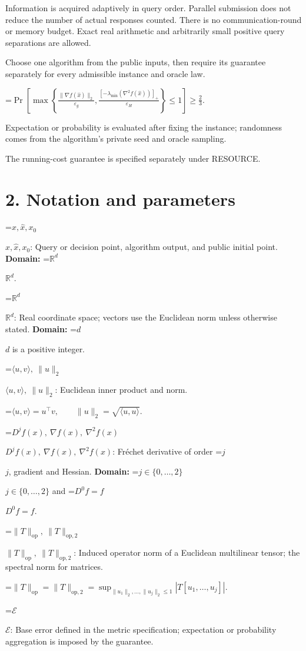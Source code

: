 \documentclass[10pt,a4paper]{article}
\newcommand{\AtlasMath}[1]{\par\begingroup\centering\setbox0=\hbox{$\displaystyle #1$}\ifdim\wd0>1.4\linewidth\typeout{ATLAS WIDE FORMULA: \the\wd0}\fi\ifdim\wd0>\linewidth\resizebox{\linewidth}{!}{\box0}\else\box0\fi\par\endgroup}
\newcommand{\AtlasInlineMath}[1]{\begingroup\setbox0=\hbox{$#1$}\ifdim\wd0>.4\linewidth\endgroup\AtlasMath{#1}\else\endgroup$#1$\fi}
\begin{document}
Information is acquired adaptively in query order. Parallel submission does not reduce the number of actual responses counted. There is no communication-round or memory budget. Exact real arithmetic and arbitrarily small positive query separations are allowed.

Choose one algorithm from the public inputs, then require its guarantee separately for every admissible instance and oracle law.


\AtlasMath{\Pr\!\left[\max\left\{\frac{\|\nabla f(\widehat{x})\|_2}{\varepsilon_g},\frac{[-\lambda_{\min}(\nabla^2f(\widehat{x}))]_+}{\varepsilon_H}\right\}\le 1\right]\ge\frac23.}


Expectation or probability is evaluated after fixing the instance; randomness comes from the algorithm's private seed and oracle sampling.

The running-cost guarantee is specified separately under RESOURCE.

\section{2. Notation and parameters}
\AtlasInlineMath{x,\widehat{x},x_0}: Query or decision point, algorithm output, and public initial point. \textbf{Domain:} \AtlasInlineMath{\mathbb{R}^d}.

\AtlasInlineMath{\mathbb{R}^d}: Real coordinate space; vectors use the Euclidean norm unless otherwise stated. \textbf{Domain:} \AtlasInlineMath{d} is a positive integer.

\AtlasInlineMath{\langle u,v\rangle,\ \|u\|_2}: Euclidean inner product and norm.


\AtlasMath{\langle u,v\rangle=u^\top v,\qquad\|u\|_2=\sqrt{\langle u,u\rangle}.}


\AtlasInlineMath{D^jf(x),\ \nabla f(x),\ \nabla^2f(x)}: Fréchet derivative of order \AtlasInlineMath{j}, gradient and Hessian. \textbf{Domain:} \AtlasInlineMath{j\in\{0,\ldots,2\}} and \AtlasInlineMath{D^0f=f}.

\AtlasInlineMath{\|T\|_{\mathrm{op}},\ \|T\|_{\mathrm{op},2}}: Induced operator norm of a Euclidean multilinear tensor; the spectral norm for matrices.


\AtlasMath{\|T\|_{\mathrm{op}}=\|T\|_{\mathrm{op},2}=\sup_{\|u_1\|_2,\ldots,\|u_j\|_2\le1}|T[u_1,\ldots,u_j]|.}


\AtlasInlineMath{\mathcal{E}}: Base error defined in the metric specification; expectation or probability aggregation is imposed by the guarantee.
\end{document}
